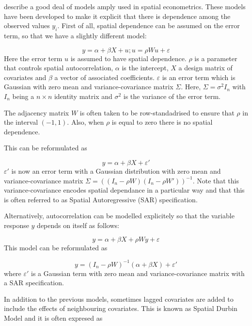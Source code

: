 \documentclass[article]{jss}
\begin{document}
\citet{LeSagePace:2009} describe a good deal of models amply used in spatial
econometrics. These models have been developed to make it explicit that there
is dependence among the observed values $y_i$. First of all, spatial dependence
can be assumed on the error term, so that we have a slightly different model:

\begin{equation}
y= \alpha+\beta X +u; u=\rho W u+\varepsilon
\end{equation}
\noindent
Here the error term $u$ is assumed to have spatial dependence.  $\rho$ is a
parameter that controls spatial autocorrelation, $\alpha$ is the intercept, $X$
a design matrix of covariates and $\beta$ a vector of associated coefficients.
$\varepsilon$ is an error term which is Gaussian with zero mean and
variance-covariance matrix $\Sigma$. Here, $\Sigma = \sigma^2 I_n$ with $I_n$
being a $n\times n$ identity matrix and $\sigma^2$ is the variance of the error
term.


The adjacency matrix $W$ is often taken to be row-standadrised \citep[see, for
example,][]{Haining:2003} to ensure that $\rho$ in the interval $(-1, 1)$.
Also, when $\rho$ is equal to zero there is no spatial dependence.

This can be reformulated as

\begin{equation}
y= \alpha+\beta X+\varepsilon'
\end{equation}
\noindent
$\varepsilon '$ is now an error term with a Gaussian distribution with zero
mean and variance-covariance matrix $\Sigma=((I_n-\rho W)(I_n-\rho W'))^{-1}$.
Note that this variance-covariance encodes spatial dependance in a particular
way and that this is often referred to as Spatial Autoregressive (SAR)
specification.


Alternatively, autocorrelation can be modelled explicitely so that the
variable response $y$ depends on itself as follows:

$$
y= \alpha+\beta X+\rho W y +\varepsilon 
$$
\noindent
This model can be reformulated as

\begin{equation}
y = (I_n-\rho W)^{-1}(\alpha+\beta X)+\varepsilon ' 
\label{eq:slm}
\end{equation}
\noindent
where $\varepsilon '$ is a Gaussian term with zero mean and
variance-covariance matrix with a SAR specification.

In addition to the previous models, sometimes lagged covariates are 
added to include the effects of neighbouring covariates. This is known
as Spatial Durbin Model  and it is often expresed as
\end{document}
